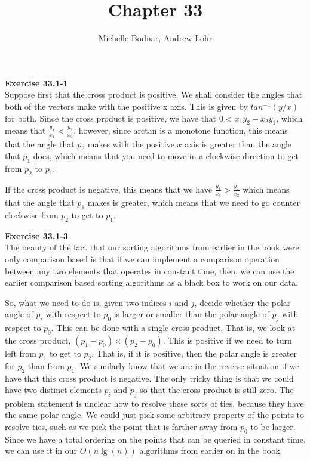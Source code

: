 \documentclass{article}
\title{Chapter 33}
\author{Michelle Bodnar, Andrew Lohr}
\begin{document}
\maketitle
\noindent\textbf{Exercise 33.1-1}\\
Suppose first that the cross product is positive. We shall consider the angles that both of the vectors make with the positive x axis. This is given by $tan^{-1}(y/x)$ for both. Since the cross product is positive, we have that $0 < x_1 y_2 - x_2y_1$, which means that $\frac{y_1}{x_1} < \frac{y_2}{x_2}$. however, since arctan is a monotone function, this means that the angle that $p_2$ makes with the positive $x$ axis is greater than the angle that $p_1$ does, which means that you need to move in a clockwise direction to get from $p_2$ to $p_1$.

If the cross product is negative, this means that we have $\frac{y_1}{x_1} > \frac{y_2}{x_2}$ which means that the angle that $p_1$ makes is greater, which means that we need to go counter clockwise from $p_2$ to get to $p_1$.


\noindent\textbf{Exercise 33.1-3}\\

The beauty of the fact that our sorting algorithms from earlier in the book were only comparison based is that if we can implement a comparison operation between any two elements that operates in constant time, then, we can use the earlier comparison based sorting algorithms as a black box to work on our data.

So, what we need to do is, given two indices $i$ and $j$, decide whether the polar angle of $p_i$ with respect to $p_0$ is larger or smaller than the polar angle of $p_j$ with respect to $p_0$. This can be done with a single cross product. That is, we look at the cross product, $(p_1- p_0)\times(p_2-p_0)$. This is positive if we need to turn left from $p_1$ to get to $p_2$. That is, if it is positive, then the polar angle is greater for $p_2$ than from $p_1$. We similarly know that we are in the reverse situation if we have that this cross product is negative. The only tricky thing is that we could have two distinct elements $p_i$ and $p_j$ so that the cross product is still zero. The problem statement is unclear how to resolve these sorts of ties, because they have the same polar angle. We could just pick some arbitrary property of the points to resolve ties, such as we pick the point that is farther away from $p_0$ to be larger. Since we have a total ordering on the points that can be queried in constant time, we can use it in our $O(n\lg(n))$ algorithms from earlier on in the book.\\
\end{document}

